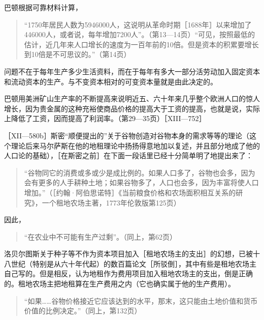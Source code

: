 \todo{}

巴顿根据可靠材料计算，

\begin{quote}{“1750年居民人数为5946000人，这说明从革命时期［1688年］以来增加了446000人，或者说，每年增加7200人”。（第13—14页）“可见，按照最低的估计，近几年来人口增长的速度为一百年前的10倍。但是资本的积累要增长到10倍是不可思议的。”（第14页）}\end{quote}

问题不在于每年生产多少生活资料，而在于每年有多大一部分活劳动加入固定资本和流动资本的生产。与不变资本相对的可变资本量就是由此决定的。

巴顿用美洲矿山生产率的不断提高来说明近五、六十年来几乎整个欧洲人口的惊人增长，因为贵金属的这种充裕使商品价格的提高大于工资的提高，也就是说，实际上降低了工资，因而提高了利润率。（第29—35页）［XIII—752］



［XII—580b］斯密“顺便提出的”关于谷物创造对谷物本身的需求等等的理论（这个理论后来马尔萨斯在他的地租理论中扬扬得意地加以复述，并且部分地成了他的人口论的基础），［在斯密之前］在下面一段话里已经十分简单明了地提出来了：

\begin{quote}{“谷物同它的消费或多或少是成比例的。如果人口多了，谷物也会多，因为会有更多的人手耕种土地；如果谷物多了，人口也会多，因为丰富将使人口增加。”（［约翰·阿伯思诺特］《当前粮食价格和农场面积相互关系的研究》，一个租地农场主著，1773年伦敦版第125页）}\end{quote}

因此，

\begin{quote}{“在农业中不可能有生产过剩”。（同上，第62页）}\end{quote}

洛贝尔图斯关于种子等不作为资本项目加入［租地农场主的支出］的幻想，已被十八世纪（特别是从六十年代起）的数百篇论文［所驳倒］，其中有些是租地农场主自己写的。但是相反，认为地租作为费用项目加入租地农场主的支出，倒是正确的。租地农场主把地租算在生产费用之内（它也确实属于他的生产费用）。

\begin{quote}{“如果……谷物价格接近它应该达到的水平，那末，这只能由土地价值和货币价值的比例决定。”（同上，第132页）}\end{quote}


